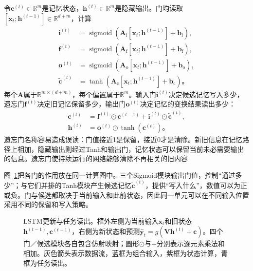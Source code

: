 令$\bm{c}^{(t)}\in\mathbb{R}^{m}$是记忆状态，$\bm{h}^{(t)}\in\mathbb{R}^{m}$是隐藏输出。门均读取$[\bm{x}_t;\bm{h}^{(t-1)}]\in\mathbb{R}^{d+m}$，计算
\begin{equation}
  \begin{aligned}
    \bm{i}^{(t)}&=\operatorname{sigmoid}\!\left(
      \bm{A}_{\mathrm{i}}[\bm{x}_t;\bm{h}^{(t-1)}]+\bm{b}_{\mathrm{i}}\right),\\
    \bm{f}^{(t)}&=\operatorname{sigmoid}\!\left(
      \bm{A}_{\mathrm{f}}[\bm{x}_t;\bm{h}^{(t-1)}]+\bm{b}_{\mathrm{f}}\right),\\
    \bm{o}^{(t)}&=\operatorname{sigmoid}\!\left(
      \bm{A}_{\mathrm{o}}[\bm{x}_t;\bm{h}^{(t-1)}]+\bm{b}_{\mathrm{o}}\right),\\
    \widetilde{\bm{c}}^{(t)}&=\tanh\!\left(
      \bm{A}_{\mathrm{c}}[\bm{x}_t;\bm{h}^{(t-1)}]+\bm{b}_{\mathrm{c}}\right)\text{。}
  \end{aligned}
  \label{eq:rnn-lstm-gates}
\end{equation}
每个$\bm{A}$属于$\mathbb{R}^{m\times(d+m)}$，每个偏置属于$\mathbb{R}^{m}$。输入门$\bm{i}^{(t)}$决定候选记忆写入多少，遗忘门$\bm{f}^{(t)}$决定旧记忆保留多少，输出门$\bm{o}^{(t)}$决定记忆的变换结果读出多少：
\begin{equation}
  \begin{aligned}
    \bm{c}^{(t)}&=\bm{f}^{(t)}\odot\bm{c}^{(t-1)}
       +\bm{i}^{(t)}\odot\widetilde{\bm{c}}^{(t)},\\
    \bm{h}^{(t)}&=\bm{o}^{(t)}\odot\tanh\!\left(\bm{c}^{(t)}\right)\text{。}
  \end{aligned}
  \label{eq:rnn-lstm-update}
\end{equation}
遗忘门名称容易造成误读：门值接近1是保留，接近0才是清除。新旧信息在记忆路径上相加，隐藏输出则经过Tanh和输出门，记忆状态可以保留当前未必需要输出的信息。遗忘门使持续运行的网络能够清除不再相关的旧内容

图~\ref{fig:rnn-lstm-cell}把各门的作用放在同一计算图中。三个Sigmoid模块输出门值，控制“通过多少”；与它们并排的Tanh模块产生候选记忆$\widetilde{\bm c}^{(t)}$，提供“写入什么”，数值可以为正或负。门与候选都取决于当前输入和此前状态，因此同一单元可以在不同输入位置采用不同的保留和写入策略。

\begin{figure}[htb]
  \centering
  
  \caption{LSTM更新与任务读出。框外左侧为当前输入$\bm x_t$和旧状态$\bm h^{(t-1)},\bm c^{(t-1)}$，右侧为新状态和预测$\widehat{\bm y}_t=g(\bm V\bm h^{(t)}+\bm c)$。四个门／候选模块各自包含仿射映射；圆形$\odot$与$+$分别表示逐元素乘法和相加。灰色箭头表示数据流，蓝框为组合输入，紫框为状态计算，青框为任务读出。}
  \label{fig:rnn-lstm-cell}
\end{figure}

